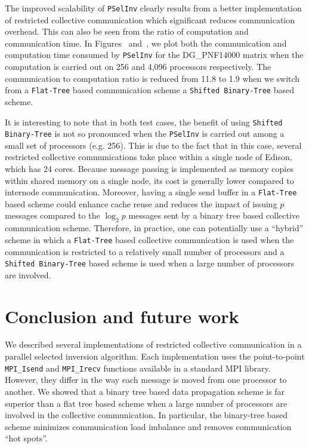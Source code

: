 \documentclass{acm_proc_article-sp}
\newcommand{\pselinv}{\texttt{PSelInv}\xspace}
\newcommand{\flattree}{\texttt{Flat-Tree}\xspace}
\newcommand{\modbtree}{\texttt{Shifted Binary-Tree}\xspace}
\begin{document}
The improved scalability of \pselinv clearly results from a better 
implementation of restricted collective communication which 
significant reduces communication overhead. This can also 
be seen from the ratio of computation and communication time. 
In Figures~ and~, we plot both the communication and computation time 
consumed by \pselinv for the DG\_PNF14000 matrix when the computation
is carried out on 256 and 4,096 processors respectively.
The communication to computation ratio is reduced from 11.8 to 1.9 
when we switch from a \flattree based communication scheme a 
\modbtree based scheme.




It is interesting to note that in both test cases, 
the benefit of using \modbtree is not so pronounced when
the \pselinv is carried out among a small set of processors
(e.g. 256). This is due to the fact that in this case,
several restricted collective communications take place 
within a single node of Edison, which has 24 cores.
Because message passing is implemented as memory copies within 
shared memory on a single node, its cost is generally lower
compared to internode communication. Moreover, having a single 
send buffer in a \flattree based scheme could enhance cache reuse
and reduces the impact of issuing $p$ messages
compared to the $\log_2 p$ messages sent by a binary tree based
collective communication scheme.
Therefore, in practice, one can potentially use a ``hybrid'' 
scheme in which a \flattree based collective communication
is used when the communication is restricted to a relatively
small number of processors and a \modbtree based 
scheme is used when a large number of processors are involved.


\section{Conclusion and future work}\label{sec:conclusion}

We described several implementations of restricted collective 
communication in a parallel selected inversion algorithm.
Each implementation uses the point-to-point \texttt{MPI\_Isend} 
and \texttt{MPI\_Irecv} functions available in a standard MPI 
library. However, they differ in the way each message is 
moved from one processor to another. We showed that
a binary tree based data propagation scheme is far superior
than a flat tree based scheme when a large number of processors
are involved in the collective communication. In particular,
the binary-tree based scheme minimizes communication load 
imbalance and removes communication ``hot spots''. 
\end{document}
